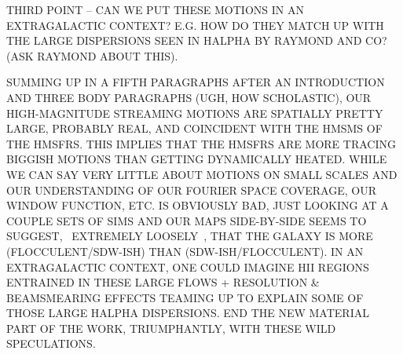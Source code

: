 THIRD POINT -- CAN WE PUT THESE MOTIONS IN AN EXTRAGALACTIC CONTEXT? E.G. HOW DO THEY MATCH UP WITH THE LARGE DISPERSIONS SEEN IN HALPHA BY RAYMOND AND CO? (ASK RAYMOND ABOUT THIS).


SUMMING UP IN A FIFTH PARAGRAPHS AFTER AN INTRODUCTION AND THREE BODY PARAGRAPHS (UGH, HOW SCHOLASTIC), OUR HIGH-MAGNITUDE STREAMING MOTIONS ARE SPATIALLY PRETTY LARGE, PROBABLY REAL, AND COINCIDENT WITH THE HMSMS OF THE HMSFRS.  
THIS IMPLIES THAT THE HMSFRS ARE MORE TRACING BIGGISH MOTIONS THAN GETTING DYNAMICALLY HEATED. 
WHILE WE CAN SAY VERY LITTLE ABOUT MOTIONS ON SMALL SCALES AND OUR UNDERSTANDING OF OUR FOURIER SPACE COVERAGE, OUR WINDOW FUNCTION, ETC. IS OBVIOUSLY BAD, JUST LOOKING AT A COUPLE SETS OF SIMS AND OUR MAPS SIDE-BY-SIDE SEEMS TO SUGGEST, ~EXTREMELY LOOSELY~, THAT THE GALAXY IS MORE (FLOCCULENT/SDW-ISH) THAN (SDW-ISH/FLOCCULENT). 
IN AN EXTRAGALACTIC CONTEXT, ONE COULD IMAGINE HII REGIONS ENTRAINED IN THESE LARGE FLOWS + RESOLUTION & BEAMSMEARING EFFECTS TEAMING UP TO EXPLAIN SOME OF THOSE LARGE HALPHA DISPERSIONS.
END THE NEW MATERIAL PART OF THE WORK, TRIUMPHANTLY, WITH THESE WILD SPECULATIONS.
